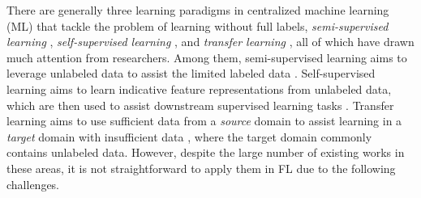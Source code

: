 \documentclass[11pt]{article}
\begin{document}
There are generally three learning paradigms in centralized machine learning (ML) that tackle the problem of learning without full labels, \textit{semi-supervised learning} \cite{Yilun-zhu2005semi,Yilun-chapelle2009semi}, \textit{self-supervised learning} \cite{Yilun-liu2021self,Yilun-jing2020self}, and \textit{transfer learning} \cite{Yilun-pan2010survey}, all of which have drawn much attention from researchers. Among them, semi-supervised learning aims to leverage unlabeled data to assist the limited labeled data \cite{Yilun-tarvainen2017mean,Yilun-miyato2018virtual,Yilun-berthelot2019mixmatch}. Self-supervised learning aims to learn indicative feature representations from unlabeled data, which are then used to assist downstream supervised learning tasks \cite{Yilun-doersch2015unsupervised,Yilun-gidaris2018unsupervised,Yilun-he2022masked}. Transfer learning aims to use sufficient data from a \textit{source} domain to assist learning in a \textit{target} domain with insufficient data \cite{Yilun-yosinski2014transferable,Yilun-long2015learning,Yilun-ganin2016domain}, where the target domain commonly contains unlabeled data. However, despite the large number of existing works in these areas, it is not straightforward to apply them in FL due to the following challenges.
\end{document}

